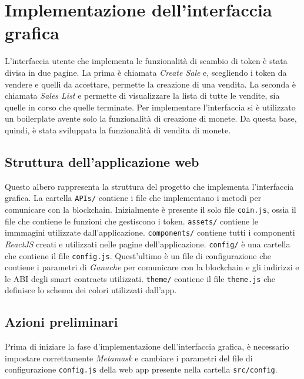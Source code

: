 \documentclass[a4paper]{article}
\begin{document}
        \newpage
        \section{Implementazione dell'interfaccia grafica}
        L'interfaccia utente che implementa le funzionalità di scambio di token è stata divisa in due pagine.
        La prima è chiamata \emph{Create Sale} e, scegliendo i token da vendere e quelli da accettare, permette
        la creazione di una vendita. La seconda è chiamata \emph{Sales List} e permette di visualizzare la lista di tutte le vendite, sia quelle in corso
        che quelle terminate.
        \newline
        Per implementare l'interfaccia si è utilizzato un boilerplate avente solo la funzionalità di creazione di monete\cite{boilerplate}. Da questa base, quindi, è stata sviluppata la funzionalità di vendita di monete. 

        \subsection{Struttura dell'applicazione web}
        Questo albero rappresenta la struttura del progetto che implementa l'interfaccia grafica. La cartella \verb|APIs/| contiene i file che implementano i metodi per comunicare con la blockchain.
        Inizialmente è presente il solo file \verb|coin.js|, ossia il file che contiene le funzioni che gestiscono i token.
        \newline
        \verb|assets/| contiene le immmagini utilizzate dall'applicazione.
        \newline
        \verb|components/| contiene tutti i componenti \emph{ReactJS} creati e utilizzati nelle pagine dell'applicazione.
        \newline
        \verb|config/| è una cartella che contiene il file \verb|config.js|. Quest'ultimo è un file di configurazione che contiene i parametri di \emph{Ganache} per comunicare con la blockchain e gli indirizzi e le ABI degli smart contracts utilizzati.
        \newline
        \verb|theme/| contiene il file \verb|theme.js| che definisce lo schema dei colori utilizzati dall'app.

        \subsection{Azioni preliminari}
        Prima di iniziare la fase d'implementazione dell'interfaccia grafica, è necessario impostare correttamente \emph{Metamask} e cambiare i parametri del file di configurazione \verb|config.js| della web app presente nella cartella \verb|src/config|.
\end{document}
